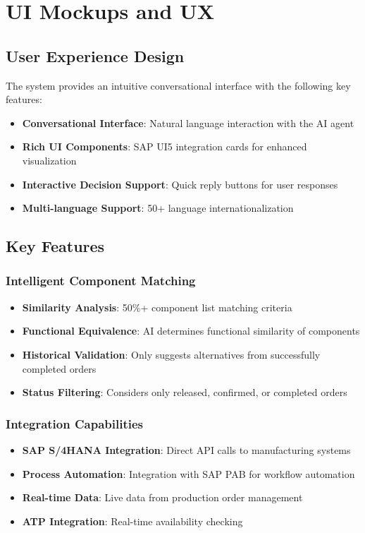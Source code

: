 \section{UI Mockups and UX}

\subsection{User Experience Design}

The system provides an intuitive conversational interface with the following key features:

\begin{itemize}
    \item \textbf{Conversational Interface}: Natural language interaction with the AI agent
    \item \textbf{Rich UI Components}: SAP UI5 integration cards for enhanced visualization
    \item \textbf{Interactive Decision Support}: Quick reply buttons for user responses
    \item \textbf{Multi-language Support}: 50+ language internationalization
\end{itemize}

\subsection{Key Features}

\subsubsection{Intelligent Component Matching}
\begin{itemize}
    \item \textbf{Similarity Analysis}: 50\%+ component list matching criteria
    \item \textbf{Functional Equivalence}: AI determines functional similarity of components
    \item \textbf{Historical Validation}: Only suggests alternatives from successfully completed orders
    \item \textbf{Status Filtering}: Considers only released, confirmed, or completed orders
\end{itemize}

\subsubsection{Integration Capabilities}
\begin{itemize}
    \item \textbf{SAP S/4HANA Integration}: Direct API calls to manufacturing systems
    \item \textbf{Process Automation}: Integration with SAP PAB for workflow automation
    \item \textbf{Real-time Data}: Live data from production order management
    \item \textbf{ATP Integration}: Real-time availability checking
\end{itemize}

